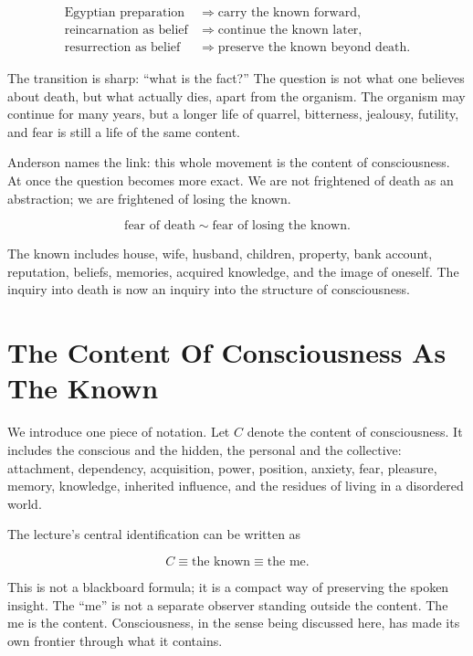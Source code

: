 \begin{align}
\text{Egyptian preparation} &\Rightarrow \text{carry the known forward}, \\
\text{reincarnation as belief} &\Rightarrow \text{continue the known later}, \\
\text{resurrection as belief} &\Rightarrow \text{preserve the known beyond death}.
\end{align}

The transition is sharp: ``what is the fact?'' The question is not what one believes about death, but what actually dies, apart from the organism. The organism may continue for many years, but a longer life of quarrel, bitterness, jealousy, futility, and fear is still a life of the same content.

Anderson names the link: this whole movement is the content of consciousness. At once the question becomes more exact. We are not frightened of death as an abstraction; we are frightened of losing the known.

\begin{equation}
\text{fear of death}
\sim
\text{fear of losing the known}.
\end{equation}

The known includes house, wife, husband, children, property, bank account, reputation, beliefs, memories, acquired knowledge, and the image of oneself. The inquiry into death is now an inquiry into the structure of consciousness.

\section{The Content Of Consciousness As The Known}

We introduce one piece of notation. Let \(C\) denote the content of consciousness. It includes the conscious and the hidden, the personal and the collective: attachment, dependency, acquisition, power, position, anxiety, fear, pleasure, memory, knowledge, inherited influence, and the residues of living in a disordered world.

The lecture's central identification can be written as

\begin{equation}
C \equiv \text{the known} \equiv \text{the me}.
\end{equation}

This is not a blackboard formula; it is a compact way of preserving the spoken insight. The ``me'' is not a separate observer standing outside the content. The me is the content. Consciousness, in the sense being discussed here, has made its own frontier through what it contains.

